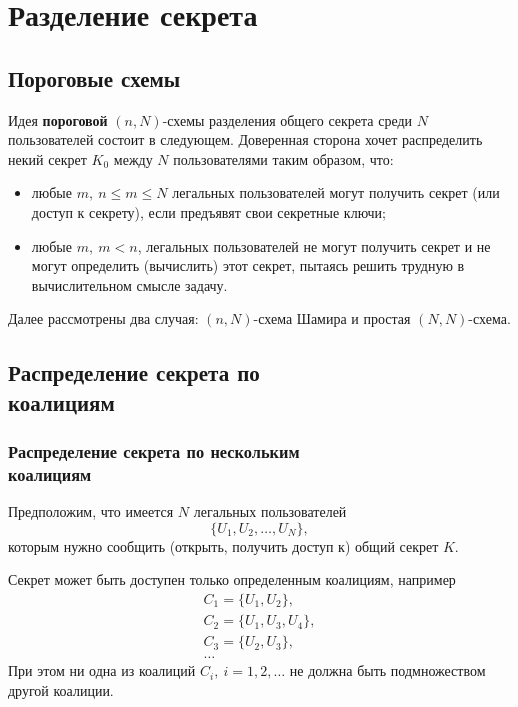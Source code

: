 \documentclass[10pt,a4paper]{book}
\begin{document}
\chapter{Разделение секрета}

\section{Пороговые схемы}

Идея \textbf{пороговой} $(n, N)$-схемы разделения общего секрета среди $N$ пользователей состоит в следующем.
Доверенная сторона хочет распределить некий секрет $K_0$ между $N$ пользователями таким образом, что:
\begin{itemize}
    \item любые $m, ~ n \le m \le N$ легальных пользователей могут получить секрет (или доступ к секрету), если предъявят свои секретные ключи;
    \item любые $m, ~ m < n$, легальных пользователей не могут получить секрет и не могут определить (вычислить) этот секрет, пытаясь решить трудную в вычислительном смысле задачу.
\end{itemize}

Далее рассмотрены два случая: $(n, N)$-схема Шамира и простая $(N,N)$-схема.





\section[Распределение секрета по коалициям]{Распределение секрета по \protect\\ коалициям}

\subsection[Схема для нескольких коалиций]{Распределение секрета по нескольким \protect\\ коалициям}

Предположим, что имеется $N$ легальных пользователей
    \[ \{ U_1, U_2, \dots, U_N \}, \]
которым нужно сообщить (открыть, получить доступ к) общий секрет $K$.

Секрет может быть доступен только определенным коалициям, например
\[ \begin{array}{l}
    C_1 = \{ U_1, U_2 \}, \\
    C_2 = \{ U_1, U_3, U_4 \}, \\
    C_3 = \{ U_2, U_3 \}, \\
    \dots
\end{array} \]
При этом ни одна из коалиций $C_i, ~ i = 1, 2, \dots$ не должна быть подмножеством другой коалиции.
\end{document}
